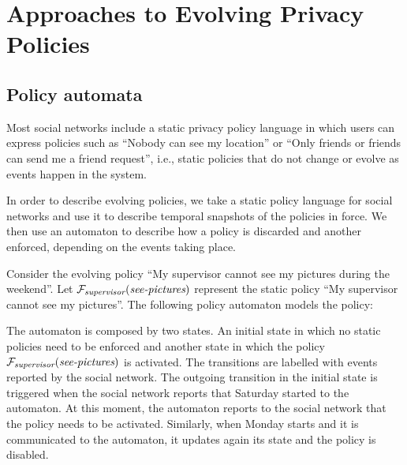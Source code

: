 \vspace{-2mm}
\section{Approaches to Evolving Privacy Policies}

\subsection{Policy automata}

Most social networks include a static privacy policy language in which users can express policies such as ``Nobody can see my location'' or ``Only friends or friends can send me a friend request'', i.e., static policies that do not change or evolve as events happen in the system.

In order to describe evolving policies, we take a static policy language for social networks and use it to describe temporal snapshots of the policies in force. We then use an automaton to describe how a policy is discarded and another enforced, depending on the events taking place.

\begin{example}

Consider the evolving policy ``My supervisor cannot see my pictures during the weekend''. Let ${\mathcal F}_{\textit{supervisor}}(\textit{see-pictures})$ represent the static policy ``My supervisor cannot see my pictures''. The following policy automaton models the policy:

\centerline{}

The automaton is composed by two states. An initial state in which no static policies need to be enforced and another state in which the policy ${\mathcal F}_{\textit{supervisor}}(\textit{see-pictures})$ is activated. The transitions are labelled with events reported by the social network. The outgoing transition in the initial state is triggered when the social network reports that Saturday started to the automaton. At this moment, the automaton reports to the social network that the policy needs to be activated. Similarly, when Monday starts and it is communicated to the automaton, it updates again its state and the policy is disabled.
\end{example}

